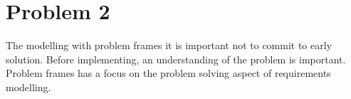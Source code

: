 \chapter{Problem 2}
The modelling with problem frames it is important not to commit to early solution. Before implementing, an understanding of the problem is important. Problem frames has a focus on the problem solving aspect of requirements modelling. 
